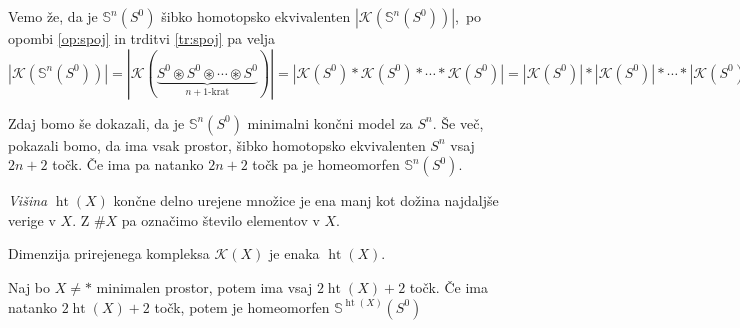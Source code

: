 \documentclass[mat1]{fmfdelo}
\DeclareMathOperator*{\htt}{ht}
\newcommand{\Sus}{\mathbb S}
\begin{document}
  \begin{dokaz}
      Vemo že, da je $\Sus^n(S^0)$ šibko homotopsko ekvivalenten $|\mathcal{K}(\Sus^n(S^0))|$,\ 
      po opombi \ref{op:spoj} in trditvi \ref{tr:spoj} pa velja $|\mathcal{K}(\Sus^n(S^0))|=|\mathcal{K}(\underbrace{S^0\circledast S^0 \circledast \cdots \circledast S^0}_\text{$n+1$-krat})|=
      |\mathcal{K}(S^0)\ast\mathcal{K}(S^0) \ast \cdots \ast \mathcal{K}(S^0)|=|\mathcal{K}(S^0)|\ast
      |\mathcal{K}(S^0)| \ast \cdots \ast |\mathcal{K}(S^0)|=S^0\ast
      S^0 \ast \cdots \ast S^0=S^n$
  \end{dokaz}

  Zdaj bomo še dokazali, da je $\Sus^n(S^0)$ minimalni končni model za $S^n$. Še več, pokazali bomo, da ima vsak prostor, šibko homotopsko ekvivalenten $S^n$ vsaj $2n+2$ točk. Če ima pa natanko $2n+2$ točk pa je homeomorfen $\Sus^n(S^0)$.

  \begin{definicija}
      \textit{Višina} $\htt(X)$ končne delno urejene množice je ena manj kot dožina najdaljše verige v $X$. Z $\# X$ pa označimo število elementov v $X$.
  \end{definicija}
  Dimenzija prirejenega kompleksa $\mathcal{K}(X)$ je enaka $\htt(X)$.
  
  
  \begin{izrek}
      Naj bo $X\neq\ast$ minimalen prostor, potem ima vsaj $2\htt(X)+2$ točk. Če ima natanko $2\htt(X)+2$ točk, potem je homeomorfen $\Sus^{\htt(X)}(S^0)$
  \end{izrek}    
  
\end{document}
